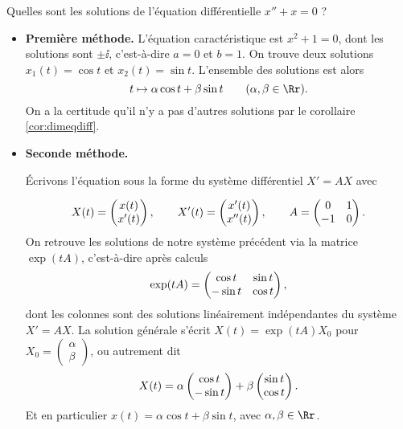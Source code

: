 \documentclass[12pt, class=report,crop=false]{standalone}
\begin{document}
\begin{exemple}
Quelles sont les solutions de l'équation différentielle $x''+x=0$ ?


\begin{itemize}
  \item \textbf{Première méthode.}
  L'équation caractéristique est $x^2+1=0$, dont les solutions sont $\pm\ii$, c'est-à-dire 
  $a=0$ et $b=1$. On trouve deux solutions $x_1(t) = \cos t$ et $x_2(t)=\sin t$. L'ensemble des solutions
  est alors   
  $$t \mapsto \alpha \cos t + \beta \sin t \qquad (\alpha,\beta \in \Rr).$$
  On a la certitude qu'il n'y a pas d'autres solutions par le corollaire \ref{cor:dimeqdiff}.
  
  
  \item \textbf{Seconde méthode.} 

  \'Ecrivons l'équation sous la forme du système différentiel $X' = AX$ avec
  
$$
X(t) = \begin{pmatrix}x(t)\cr x'(t)\end{pmatrix},\qquad 
X'(t) = \begin{pmatrix}x'(t)\cr x''(t)\end{pmatrix},\qquad
A = \begin{pmatrix}0&1\cr-1&0\end{pmatrix}.
$$
On retrouve les solutions de notre système précédent via la matrice $\exp (tA)$, c'est-à-dire après calculs 
$$\exp (tA) = \begin{pmatrix}\cos t&\sin t\cr-\sin t&\cos t \end{pmatrix},$$
dont les colonnes sont des solutions linéairement indépendantes du système $X'=AX$.
La solution générale s'écrit $X(t) = \exp (tA) X_0$ pour 
$X_0 = \left( \begin{smallmatrix} \alpha \\ \beta \end{smallmatrix} \right)$, ou autrement dit
$$X(t)= \alpha \begin{pmatrix}\cos t\cr -\sin t\end{pmatrix} +  \beta \begin{pmatrix}\sin t\cr \cos t\end{pmatrix}.$$
Et en particulier $x(t) = \alpha \cos t + \beta \sin t$, avec $\alpha, \beta \in \Rr$. 
\end{itemize}
\end{exemple}



\end{document}
